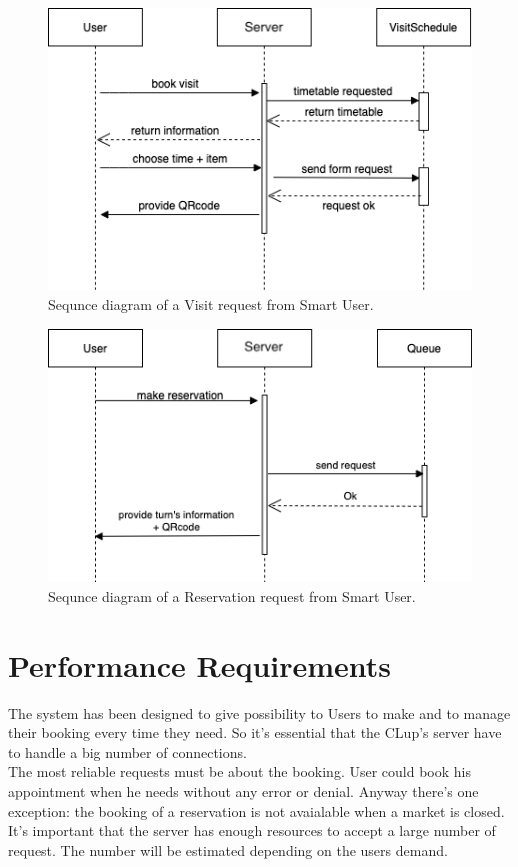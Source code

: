 \begin{figure}[H]
  \caption{Sequnce diagram of a Visit request from Smart User.}
  \label{fig:SD_visit}
  \centering
  \includegraphics[scale=0.45]{diagrams/SD_visit.png}

\end{figure}



\begin{figure}[H]
  \caption{Sequnce diagram of a Reservation request from Smart User.}
  \label{fig:SD_reservation}
  \centering
  \includegraphics[scale=0.45]{diagrams/SD_reservation.png}

\end{figure}

\bigbreak

\section{Performance Requirements}
The system has been designed to give possibility to Users to make and to manage their booking every time they need. So it's essential that the CLup's server have to handle a big number of connections. \\
The most reliable requests must be about the booking. User could book his appointment when he needs without any error or denial. 
Anyway there's one exception: the booking of a reservation is not avaialable when a market is closed.\\
It's important that the server has enough resources to accept a large number of request. The number will be estimated depending on the users demand.
\bigbreak

